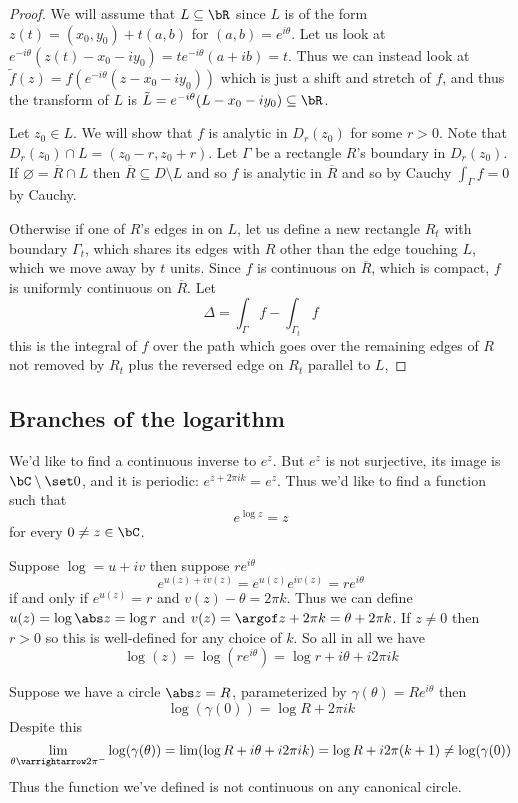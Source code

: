\documentclass[10pt]{article}
\let\to=\varrightarrow
\begin{document}
\begin{proof}

    We will assume that $L\subseteq\bR$ since $L$ is of the form $z(t)=(x_0,y_0) + t(a,b)$ for $(a,b)=e^{i\theta}$.
    Let us look at $e^{-i\theta}(z(t)-x_0-iy_0) = te^{-i\theta}(a+ib)=t$.
    Thus we can instead look at $\tilde f(z)=f(e^{-i\theta}(z-x_0-iy_0))$ which is just a shift and stretch of $f$, and thus the transform of $L$ is $\tilde L=e^{-i\theta}(L-x_0-iy_0)\subseteq\bR$.

    Let $z_0\in L$.
    We will show that $f$ is analytic in $D_r(z_0)$ for some $r>0$.
    Note that $D_r(z_0)\cap L=(z_0-r,z_0+r)$.
    Let $\Gamma$ be a rectangle $R$'s boundary in $D_r(z_0)$.
    If $\varnothing=\overline R\cap L$ then $\overline R\subseteq D\setminus L$ and so $f$ is analytic in $\overline R$ and so by Cauchy $\int_\Gamma f=0$ by Cauchy.

    Otherwise if one of $R$'s edges in on $L$, let us define a new rectangle $R_t$ with boundary $\Gamma_t$, which shares its edges with $R$ other than the edge touching $L$, which we move away by $t$ units.
    Since $f$ is continuous on $\overline R$, which is compact, $f$ is uniformly continuous on $\overline R$.
    Let
    \[ \Delta = \int_\Gamma f - \int_{\Gamma_t}f \]
    this is the integral of $f$ over the path which goes over the remaining edges of $R$ not removed by $R_t$ plus the reversed edge on $R_t$ parallel to $L$, 

\end{proof}

\subsection{Branches of the logarithm}

We'd like to find a continuous inverse to $e^z$.
But $e^z$ is not surjective, its image is $\bC\setminus\set0$, and it is periodic: $e^{z+2\pi ik}=e^z$.
Thus we'd like to find a function such that
\[ e^{\log z} = z \]
for every $0\neq z\in\bC$.

Suppose $\log=u+iv$ then suppose $re^{i\theta}$
\[ e^{u(z)+iv(z)} = e^{u(z)}e^{iv(z)} = re^{i\theta} \]
if and only if $e^{u(z)}=r$ and $v(z)-\theta=2\pi k$.
Thus we can define $u(z)=\log\abs z=\log r$ and $v(z)=\argof z+2\pi k=\theta+2\pi k$.
If $z\neq0$ then $r>0$ so this is well-defined for any choice of $k$.
So all in all we have
\[ \log(z) = \log(re^{i\theta}) = \log r+i\theta + i2\pi ik \]

Suppose we have a circle $\abs z=R$, parameterized by $\gamma(\theta)=Re^{i\theta}$ then
\[ \log(\gamma(0)) = \log R + 2\pi ik \]
Despite this
\[ \lim_{\theta\to2\pi^-}\log(\gamma(\theta)) = \lim(\log R+i\theta+i2\pi ik) = \log R + i2\pi(k+1) \neq \log(\gamma(0)) \]
Thus the function we've defined is not continuous on any canonical circle.
\end{document}
